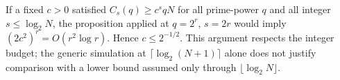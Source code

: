 If a fixed $c>0$ satisfied $C_s(q)\geq c^s qN$ for all prime-power
$q$ and all integer $s\leq\log_2N$, the proposition applied at
$q=2^r$, $s=2r$ would imply
$(2c^2)^r=O(r^2\log r)$. Hence $c\leq2^{-1/2}$.
This argument respects the integer budget; the generic simulation
at $\lceil\log_2(N+1)\rceil$ alone does not justify comparison with a
lower bound assumed only through $\lfloor\log_2N\rfloor$.
